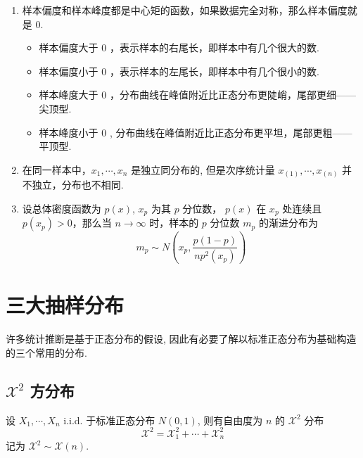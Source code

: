 \documentclass[a5paper,12pt]{article}
\begin{document}
\begin{enumerate}
  \item 样本偏度和样本峰度都是中心矩的函数，如果数据完全对称，那么样本偏度就是 $0$.
  \begin{itemize}
    \item 样本偏度大于 $0$ ，表示样本的右尾长，即样本中有几个很大的数.
    \item 样本偏度小于 $0$ ，表示样本的左尾长，即样本中有几个很小的数.
    \item 样本峰度大于 $0$ ，分布曲线在峰值附近比正态分布更陡峭，尾部更细——尖顶型.
    \item 样本峰度小于 $0$ , 分布曲线在峰值附近比正态分布更平坦，尾部更粗——平顶型.
  \end{itemize}
  \item 在同一样本中，$x_1,\cdots,x_n$ 是独立同分布的, 但是次序统计量 $x_{(1)},\cdots,x_{(n)}$ 并不独立，分布也不相同.
  \item 设总体密度函数为 $p(x)$, $x_p$ 为其 $p$ 分位数， $p(x)$ 在 $x_p$
  处连续且  $p(x_p)>0$，那么当  $n\to \infty$ 时，样本的 $p$ 分位数 $m_p$
  的渐进分布为
  \[
  m_p \sim N\left( x_p, \frac{p(1-p)}{np^2(x_p)}\right)
  \]
\end{enumerate}



\section{三大抽样分布}
许多统计推断是基于正态分布的假设, 因此有必要了解以标准正态分布为基础构造的三个常用的分布.

\subsection{$\mathcal{X}^2$ 方分布}
设 $X_1,\cdots,X_n$ i.i.d. 于标准正态分布  $N(0,1)$, 则有自由度为 $n$ 的 $\mathcal{X}^2$ 分布
\[
\mathcal{X}^2 = \mathcal{X}_1^2+ \cdots +\mathcal{X}_n^2
\]
记为 $\mathcal{X}^2 \sim \mathcal{X}(n)$.
\end{document}
